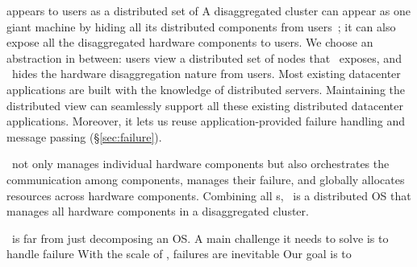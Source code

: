 \documentclass[10pt,times,twocolumn]{z2-article}
\begin{document}
\splitkernel appears to users as a distributed set of 
A disaggregated cluster can appear as one giant machine by hiding all its distributed components from users~\cite{Amoeba-Experience};
it can also expose all the disaggregated hardware components to users.
We choose an abstraction in between: users view a distributed set of nodes that \splitkernel\ exposes,
and \splitkernel\ hides the hardware disaggregation nature from users.
Most existing datacenter applications are built with the knowledge of distributed servers.
Maintaining the distributed view can seamlessly support all these existing distributed datacenter applications.
Moreover, it lets us reuse application-provided failure handling and message passing (\S\ref{sec:failure}).

\splitkernel\ not only manages individual hardware components but also orchestrates the communication
among components, manages their failure, and globally allocates resources across hardware components.
Combining all \microos{}s, \splitkernel\ is a distributed OS that manages all hardware components in a disaggregated cluster.
\fi







\splitkernel\ is far from just decomposing an OS. 
A main challenge it needs to solve is to handle failure 
With the scale of \dcrack, failures are inevitable
Our goal is to 
\end{document}
